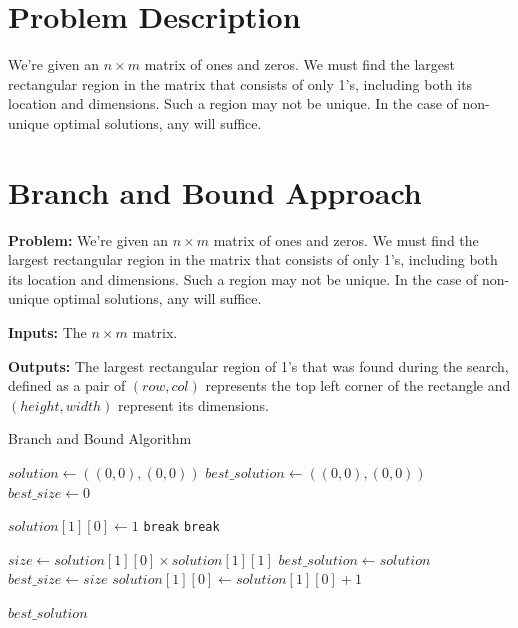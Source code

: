 \documentclass{article}
\begin{document}
\section{Problem Description}

We're given an $n \times m$ matrix of ones and zeros.
We must find the largest rectangular region in the matrix that consists of only 1's, including both its location and dimensions.
Such a region may not be unique.
In the case of non-unique optimal solutions, any will suffice.

\pagebreak
\section{Branch and Bound Approach}

\textbf{Problem:}
We're given an $n \times m$ matrix of ones and zeros.
We must find the largest rectangular region in the matrix that consists of only 1's, including both its location and dimensions.
Such a region may not be unique.
In the case of non-unique optimal solutions, any will suffice.

\textbf{Inputs:}
The $n \times m$ matrix.

\textbf{Outputs:}
The largest rectangular region of 1's that was found during the search, defined as a pair of $(row, col)$ represents the top left corner of the rectangle and $(height, width)$ represent its dimensions.

\FloatBarrier
\begin{algorithm}
\caption{Branch and Bound Algorithm}
\begin{algorithmic}[1]
	\State $solution \gets ((0, 0), (0, 0))$
	\State $best\_solution \gets ((0, 0), (0, 0))$
	\State $best\_size \gets 0$
	
			\State $solution[1][0] \gets 1$
				 \texttt{break} \EndIf
				 \texttt{break} \EndIf

					\State $size \gets solution[1][0] \times solution[1][1]$
						\State $best\_solution \gets solution$
						\State $best\_size \gets size$
					\EndIf
				\EndFor
				\State $solution[1][0] \gets solution[1][0] + 1$
			\EndWhile
		\EndFor
	\EndFor

	\State \Return $best\_solution$
\EndFunction
\end{algorithmic}
\end{algorithm}
\FloatBarrier
\end{document}
